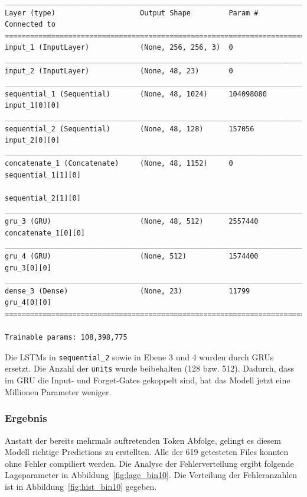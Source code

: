 \documentclass[pdftex,a4paper,halfparskip, article]{scrartcl}
\begin{document}
\begin{verbatim}
________________________________________________________________________________
Layer (type)                    Output Shape         Param #     Connected to
================================================================================
input_1 (InputLayer)            (None, 256, 256, 3)  0
________________________________________________________________________________
input_2 (InputLayer)            (None, 48, 23)       0
________________________________________________________________________________
sequential_1 (Sequential)       (None, 48, 1024)     104098080   input_1[0][0]
________________________________________________________________________________
sequential_2 (Sequential)       (None, 48, 128)      157056      input_2[0][0]
________________________________________________________________________________
concatenate_1 (Concatenate)     (None, 48, 1152)     0           sequential_1[1][0]
                                                                 sequential_2[1][0]
________________________________________________________________________________
gru_3 (GRU)                     (None, 48, 512)      2557440     concatenate_1[0][0]
________________________________________________________________________________
gru_4 (GRU)                     (None, 512)          1574400     gru_3[0][0]
________________________________________________________________________________
dense_3 (Dense)                 (None, 23)           11799       gru_4[0][0]
================================================================================

Trainable params: 108,398,775

\end{verbatim}

Die LSTMs in \texttt{sequential\_2} sowie in Ebene 3 und 4 wurden durch GRUs ersetzt. Die Anzahl der \texttt{units} wurde beibehalten (128 bzw. 512). Dadurch, dass im GRU die Input- und Forget-Gates gekoppelt sind, hat das Modell jetzt eine Millionen Parameter weniger.

\subsubsection*{Ergebnis}

Anstatt der bereits mehrmals auftretenden Token Abfolge, gelingt es diesem Modell richtige Predictions zu erstellten. Alle der 619 getesteten Files konnten ohne Fehler compiliert werden. Die Analyse der Fehlerverteilung ergibt folgende Lageparameter in Abbildung~\ref{fig:lage_bin10}. Die Verteilung der Fehleranzahlen ist in Abbildung~\ref{fig:hist_bin10} gegeben.
\end{document}
